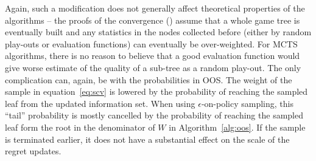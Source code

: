 Again, such a modification does not generally affect theoretical properties of the algorithms -- the proofs of the convergence (\eg \cite{lisy2013-nips}) assume that a whole game tree is eventually built and any statistics in the nodes collected before (either by random play-outs or evaluation functions) can eventually be over-weighted. For MCTS algorithms, there is no reason to believe that a good evaluation function would give worse estimate of the quality of a sub-tree as a random play-out. The only complication can, again, be with the probabilities in OOS. The weight of the sample in equation~\ref{eq:scv} is lowered by the probability of reaching the sampled leaf from the updated information set. When using $\epsilon$-on-policy sampling, this ``tail'' probability is mostly cancelled by the probability of reaching the sampled leaf form the root in the denominator of $W$ in Algorithm~\ref{alg:oos}. 
If the sample is terminated earlier, it does not have a substantial effect on the scale of the regret updates.


